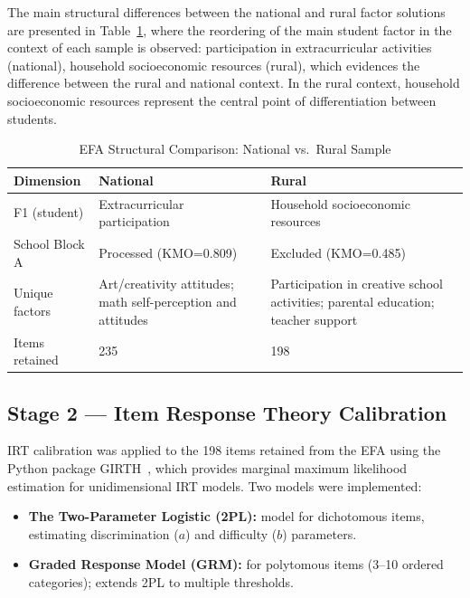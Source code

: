\documentclass[runningheads]{llncs}
\begin{document}
The main structural differences between the national and rural
factor solutions are presented in Table~\ref{tab:efa_comparison},
where the reordering of the main student factor in the context
of each sample is observed: participation in extracurricular
activities (national), household socioeconomic resources
(rural), which evidences the difference between the rural and
national context. In the rural context, household socioeconomic
resources represent the central point of differentiation between
students.

\begin{table}[!htbp]
\centering
\caption{EFA Structural Comparison: National vs.\ Rural Sample}
\label{tab:efa_comparison}
\begin{tabular}{p{2.5cm}p{3.8cm}p{3.8cm}}
\toprule
\textbf{Dimension} & \textbf{National} & \textbf{Rural} \\
\midrule
F1 (student) &
  Extracurricular participation &
  Household socioeconomic resources \\
School Block A &
  Processed (KMO=0.809) &
  Excluded (KMO=0.485) \\
Unique factors &
  Art/creativity attitudes; math self-perception and attitudes &
  Participation in creative school activities; parental
  education; teacher support \\
Items retained & 235 & 198 \\
\bottomrule
\end{tabular}
\end{table}

\subsection{Stage 2 --- Item Response Theory Calibration}

IRT calibration was applied to the 198 items retained from the
EFA using the Python package GIRTH~\cite{eribean2021girth},
which provides marginal maximum likelihood estimation for
unidimensional IRT models. Two models were implemented:

\begin{itemize}
\item \textbf{The Two-Parameter Logistic (2PL):} model for
dichotomous items, estimating discrimination (\(a\)) and
difficulty (\(b\)) parameters.
\item \textbf{Graded Response Model (GRM):} for polytomous items
(3--10 ordered categories); extends 2PL to multiple thresholds.
\end{itemize}
\end{document}
